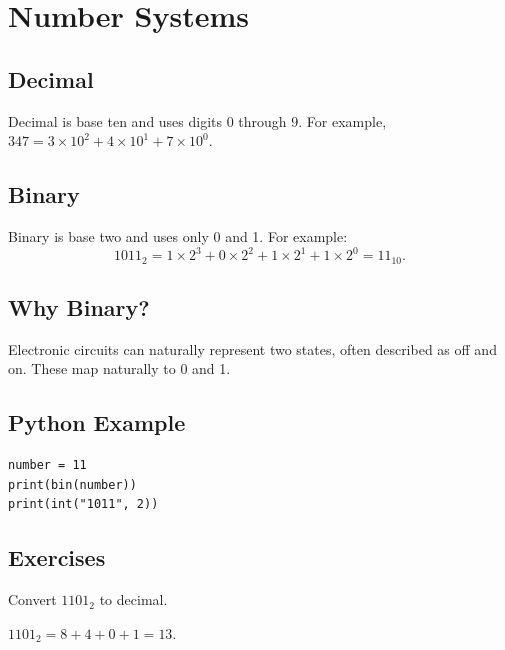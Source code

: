 \chapter{Number Systems}
\label{chap:number-systems}
\section{Decimal}Decimal is base ten and uses digits 0 through 9. For example, \(347=3\times10^2+4\times10^1+7\times10^0\).
\section{Binary}Binary is base two and uses only 0 and 1. For example:
\[1011_2=1\times2^3+0\times2^2+1\times2^1+1\times2^0=11_{10}.\]
\section{Why Binary?}Electronic circuits can naturally represent two states, often described as off and on. These map naturally to 0 and 1.
\section{Python Example}\begin{lstlisting}
number = 11
print(bin(number))
print(int("1011", 2))
\end{lstlisting}
\section{Exercises}\begin{exercise}Convert \(1101_2\) to decimal.\end{exercise}\begin{solution}\(1101_2=8+4+0+1=13\).\end{solution}
